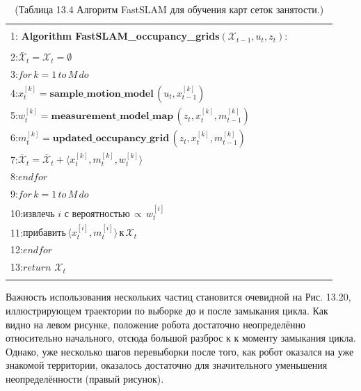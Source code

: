 \documentclass[10pt,a4paper]{article}
\begin{document}
\begin{table}[H]
\begin{center}
\begin{tabular}{|l|}
\hline
{}\\
1:\textbf{ Algorithm FastSLAM\_occupancy\_grids}$(\mathcal{X}_{t-1},u_t,z_t):\qquad\qquad$\\
{}\\
2:\hspace{5mm}$ \bar{\mathcal{X}}_t=\mathcal{X}_t=\emptyset$\\
3:\hspace{5mm}$\textit{for}\,k=1\,\textit{to}\,M\,\textit{do}$\\
4:\hspace{10mm}$x_t^{[k]}=\textbf{sample\_motion\_model}\,(u_t,x_{t-1}^{[k]})$\\
5:\hspace{10mm}$w_t^{[k]}=\textbf{measurement\_model\_map}\,(z_t,x_t^{[k]},m_{t-1}^{[k]})$\\
6:\hspace{10mm}$m_t^{[k]}=\textbf{updated\_occupancy\_grid}\,(z_t,x_t^{[k]},m_{t-1}^{[k]})$\\
7:\hspace{10mm}$\bar{\mathcal{X}}_t=\bar{\mathcal{X}}_t+\langle x_t^{[k]},m_t^{[k]},w_t^{[k]}\rangle$\\
8:\hspace{5mm}$\textit{endfor}$\\
9:\hspace{5mm}$\textit{for}\,k=1\,\textit{to}\,M\,\textit{do}$\\
10:\hspace{9mm}$\textit{извлечь i с вероятностью}\,\propto\,w_t^{[i]}$\\
11:\hspace{9mm}$\textit{прибавить}\,\langle x_t^{[i]},m_t^{[i]}\rangle\,\textit{к}\,\mathcal{X}_t$\\
12:\hspace{5mm}$\textit{endfor}$\\
13:\hspace{5mm}$\textit{return}\,\,\mathcal{X}_t$\\
{}\\
\hline
\end{tabular}
\caption{(Таблица 13.4    Алгоритм FastSLAM для обучения карт сеток занятости.)}
\end{center}
\end{table}


Важность использования нескольких частиц становится очевидной на Рис. 13.20, иллюстрирующем траектории по выборке до и после замыкания цикла. Как видно на левом рисунке, положение робота достаточно неопределённо относительно начального, отсюда большой разброс к к моменту замыкания цикла. Однако, уже несколько шагов перевыборки после того, как робот оказался на уже знакомой территории, оказалось достаточно для значительного уменьшения неопределённости (правый рисунок).\\
\end{document}
